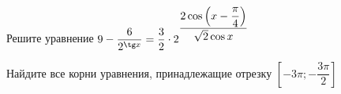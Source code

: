 \begin{ex}
	\begin{condition}
		\begin{enumcols}[label=\asbuk*)]
			\item Решите уравнение \( 9 - \dfrac{6}{2^{\tg x} } = \dfrac{3}{2}\cdot 2^{\dfrac{2\cos{\left(x - \dfrac{\pi}{4}\right)}}{\sqrt{2}\cos x}} \)
			\item Найдите все корни уравнения, принадлежащие отрезку \( \left[-3\pi;-\dfrac{3\pi}{2}\right] \)
		\end{enumcols}
	\end{condition}
\end{ex}